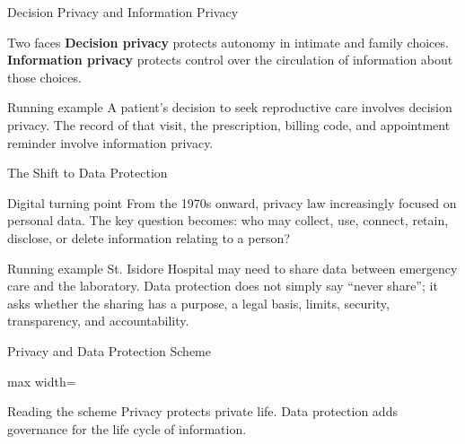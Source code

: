 \documentclass[presentation]{beamer}
\newcommand{\scenario}{St. Isidore Hospital}
\begin{document}
\begin{frame}[c]{Decision Privacy and Information Privacy}
\begin{block}{Two faces}
\textbf{Decision privacy} protects autonomy in intimate and family choices. \textbf{Information
privacy} protects control over the circulation of information about those choices.
\end{block}

\begin{exampleblock}{Running example}
A patient's decision to seek reproductive care involves decision privacy. The record of that visit,
the prescription, billing code, and appointment reminder involve information privacy.
\end{exampleblock}
\end{frame}

\begin{frame}[c]{The Shift to Data Protection}
\begin{block}{Digital turning point}
From the 1970s onward, privacy law increasingly focused on personal data. The key question becomes:
who may collect, use, connect, retain, disclose, or delete information relating to a person?
\end{block}

\begin{exampleblock}{Running example}
\scenario{} may need to share data between emergency care and the laboratory. Data protection does
not simply say ``never share''; it asks whether the sharing has a purpose, a legal basis, limits,
security, transparency, and accountability.
\end{exampleblock}
\end{frame}

\begin{frame}[c]{Privacy and Data Protection Scheme}
\begin{center}
\begin{adjustbox}{max width=\textwidth}
\end{adjustbox}
\end{center}

\begin{block}{Reading the scheme}
Privacy protects private life. Data protection adds governance for the life cycle of information.
\end{block}
\end{frame}
\end{document}
